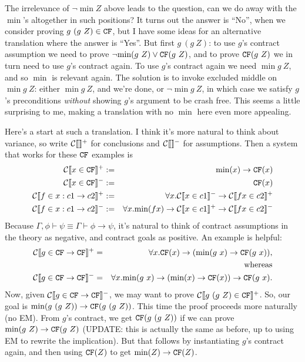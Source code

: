 \documentclass[preprint]{sigplanconf}
\begin{document}
{The irrelevance of $\lnot \min{Z}$ above leads to the question, can we
do away with the $\min{}$'s altogether in such positions?  It turns
out the answer is ``No'', when we consider proving $g ~(g ~Z) \in
\texttt{CF}$, but I have some ideas for an alternative translation where the
answer is ``Yes''.  But first $g ~(g ~Z)$: to use $g$'s contract
assumption we need to prove $\lnot \mbox{min}(g ~Z) \lor \texttt{CF}(g ~Z)$, and to
prove $\texttt{CF}(g ~Z)$ we in turn need to use $g$'s contract again.  To use
$g$'s contract again we need $\min{g ~Z}$, and so $\min{}$ is relevant
again.  The solution is to invoke excluded middle on $\min{g ~Z}$:
either $\min{g ~Z}$, and we're done, or $\lnot \min{g ~Z}$, in which
case we satisfy $g$'s preconditions \emph{without} showing $g$'s
argument to be crash free.  This seems a little surprising to me,
making a translation with no $\min{}$ here even more appealing.

Here's a start at such a translation.  I
think it's more natural to think about variance, so write
$\mathcal{C} \llbracket  \rrbracket^+$ for conclusions and $\mathcal{C} \llbracket  \rrbracket^-$ for assumptions.  Then
a system that works for these $\texttt{CF}$ examples is
\protect \begin{eqnarray*}
\mathcal{C} \llbracket x \in \texttt{CF} \rrbracket^+ &:=& \mbox{min}(x) \to \texttt{CF}(x) \\
\mathcal{C} \llbracket x \in \texttt{CF} \rrbracket^- &:=& \texttt{CF}(x)\\
\mathcal{C} \llbracket f \in x:c1 \to c2 \rrbracket^+ &:=& \forall x.               
  \mathcal{C} \llbracket x \in c1 \rrbracket^- \to \mathcal{C} \llbracket f x \in c2 \rrbracket^+\\
\mathcal{C} \llbracket f \in x:c1 \to c2 \rrbracket^- &:=& \forall x. \mbox{min}(f x) \to 
  \mathcal{C} \llbracket x \in c1 \rrbracket^+ \to \mathcal{C} \llbracket f x \in c2 \rrbracket^-
\end{eqnarray*}
Because $\Gamma,\phi \vdash \psi \equiv \Gamma \vdash \phi \to \psi$,
it's natural to think of contract assumptions in the theory as
negative, and contract goals as positive.  An example is helpful:
\protect \begin{eqnarray*}
\mathcal{C} \llbracket g \in \texttt{CF} \to \texttt{CF} \rrbracket^+ &=& \forall x. \texttt{CF}(x) \to (\mbox{min}(g ~x) \to \texttt{CF}(g ~x)),\\
&&\text{whereas}\\
\mathcal{C} \llbracket g \in \texttt{CF} \to \texttt{CF} \rrbracket^- &=& \forall x. \mbox{min}(g ~x) \to (\mbox{min}(x) \to \texttt{CF}(x)) \to \texttt{CF}(g ~x).
\end{eqnarray*}
Now, given $\mathcal{C} \llbracket g \in \texttt{CF} \to \texttt{CF} \rrbracket^-$, we may 
want to prove $\mathcal{C} \llbracket g ~(g ~Z) \in \texttt{CF} \rrbracket^+$.
So, our goal is $\mbox{min}(g ~(g ~Z)) \to \texttt{CF}(g ~(g ~Z))$.
This time the proof proceeds more naturally (no EM).  
From $g$'s contract, we get $\texttt{CF}(g ~(g ~Z))$ if we can prove 
$\mbox{min}(g ~Z) \to \texttt{CF}(g ~Z)$ (UPDATE: this is actually the same as 
before, up to using EM to rewrite the implication).
But that follows by instantiating $g$'s contract again, and 
then using $\texttt{CF}(Z)$ to get $\mbox{min}(Z) \to \texttt{CF}(Z)$.

}
\end{document}
